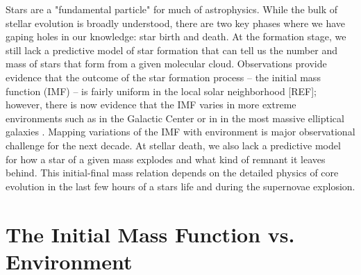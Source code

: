 \documentclass[11pt]{article}
\begin{document}
%


%

\sciencejustification

Stars are a "fundamental particle" for much of astrophysics. While the bulk of stellar evolution is broadly understood, there are two key phases where we have gaping holes in our knowledge: star birth and death. 
At the formation stage, we still lack a predictive model of star formation that can tell us the number and mass of stars that form from a given molecular cloud. 
Observations provide evidence that the outcome of the star formation process -- the initial mass function (IMF) -- is fairly uniform in the local solar neighborhood [REF]; however, there is now evidence that the IMF varies in more extreme environments such as in the Galactic Center \citep{Lu:2013,Hosek:2018} or in in the most massive elliptical galaxies \citep{vanDokkum:2010}. 
Mapping variations of the IMF with environment is major observational challenge for the next decade. 
At stellar death, we also lack a predictive model for how a star of a given mass explodes and what kind of remnant it leaves behind. 
This initial-final mass relation depends on the detailed physics of core evolution in the last few hours of a stars life and during the supernovae explosion. 

\section{The Initial Mass Function vs. Environment}
\end{document}
